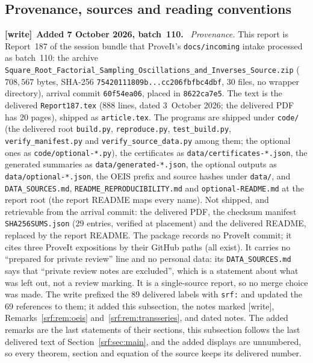 \documentclass[11pt]{article}
\theoremstyle{remark}\newtheorem{remark}[theorem]{Remark}
\newcommand{\file}[1]{\nolinkurl{#1}}
\newenvironment{writenote}[1][]{\par\smallskip\begingroup\small
 \noindent\textbf{[write]}\if\relax\detokenize{#1}\relax\else~\textbf{#1.}\fi\ }%
 {\par\endgroup\smallskip}
\begin{document}
\subsection{Provenance, sources and reading conventions}\label{srf:sec:provenance}
\begin{writenote}[Added 7 October 2026, batch~110]
\emph{Provenance.} This report is Report~187 of the session bundle that
ProveIt's \file{docs/incoming} intake processed as batch~110: the archive
\file{Square_Root_Factorial_Sampling_Oscillations_and_Inverses_Source.zip}
($708{,}567$ bytes, SHA-256 \file{75420111809b...cc206fbfbc4dbf}, 30 files,
no wrapper directory), arrival commit \file{60f54ea06}, placed in
\file{8622ca7e5}. The text is the delivered \file{Report187.tex} (888 lines,
dated 3~October 2026; the delivered PDF has 20 pages), shipped as
\file{article.tex}. The programs are shipped under \file{code/} (the
delivered root \file{build.py}, \file{reproduce.py}, \file{test_build.py},
\file{verify_manifest.py} and \file{verify_source_data.py} among them; the
optional ones as \file{code/optional-*.py}), the certificates as
\file{data/certificates-*.json}, the generated summaries as
\file{data/generated-*.json}, the optional outputs as
\file{data/optional-*.json}, the OEIS prefix and source hashes under
\file{data/}, and \file{DATA_SOURCES.md}, \file{README_REPRODUCIBILITY.md} and
\file{optional-README.md} at the report root (the report README maps every
name). Not shipped, and retrievable from the arrival commit: the delivered
PDF, the checksum manifest \file{SHA256SUMS.json} (29 entries, verified at
placement) and the delivered README, replaced by the report README. The
package records no ProveIt commit; it cites three ProveIt expositions by
their GitHub paths (all exist). It carries no ``prepared for private
review'' line and no personal data: its \file{DATA_SOURCES.md} says that
``private review notes are excluded'', which is a statement about what was
left out, not a review marking. It is a single-source report, so no merge
choice was made. The write prefixed the 89 delivered labels with \file{srf:}
and updated the 69 references to them; it added this subsection, the notes
marked [write], Remarks~\ref{srf:rem:oeis} and~\ref{srf:rem:transseries}, and
dated notes. The added remarks are the last statements of their sections,
this subsection follows the last delivered text of
Section~\ref{srf:sec:main}, and the added displays are unnumbered, so every
theorem, section and equation of the source keeps its delivered number.


\end{writenote}
\end{document}
